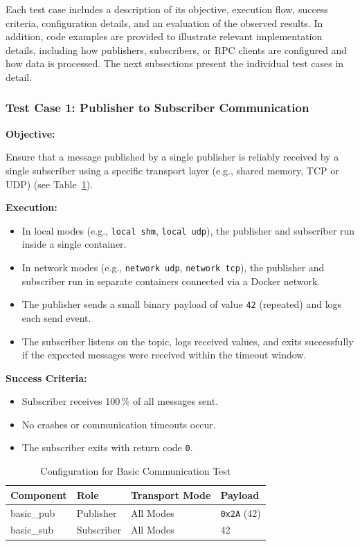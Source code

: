 Each test case includes a description of its objective, execution flow, success criteria, configuration details, and an evaluation of the observed results.  In addition, code examples are provided to illustrate relevant implementation details, including how publishers, subscribers, or RPC clients are configured and how data is processed. The next subsections present the individual test cases in detail.

\vspace{1em}
\subsubsection{Test Case 1: Publisher to Subscriber Communication}
\label{sec:tc1}
\textbf{Objective:}

\vspace{0.4em}
Ensure that a message published by a single publisher is reliably received by a single subscriber using a specific transport layer (e.g., shared memory, TCP or UDP) (see Table~\ref{tab:basic_comm_test}).

\vspace{0.5em}
\textbf{Execution:}
\begin{itemize}
	\item In local modes (e.g., \texttt{local shm}, \texttt{local udp}), the publisher and subscriber run inside a single container.
	\item In network modes (e.g., \texttt{network udp}, \texttt{network tcp}), the publisher and subscriber run in separate containers connected via a Docker network.
	\item The publisher sends a small binary payload of value \texttt{42} (repeated) and logs each send event.
	\item The subscriber listens on the topic, logs received values, and exits successfully if the expected messages were received within the timeout window.
\end{itemize}

\textbf{Success Criteria:}
\begin{itemize}
	\item Subscriber receives 100\,\% of all messages sent.
	\item No crashes or communication timeouts occur.
	\item The subscriber exits with return code \texttt{0}.
\end{itemize}

\begin{table}[H]
	\centering
	\begin{tabular}{@{}llll@{}}
		\toprule
		\textbf{Component} & \textbf{Role} & \textbf{Transport Mode} & \textbf{Payload} \\
		\midrule
		basic\_pub  & Publisher  & All Modes  & \texttt{0x2A} (42) \\
		basic\_sub  & Subscriber & All Modes  & 42 \\
		\bottomrule
	\end{tabular}
	\caption{Configuration for Basic Communication Test}
	\captionsetup{position=bottom}
	\label{tab:basic_comm_test}
\end{table}


